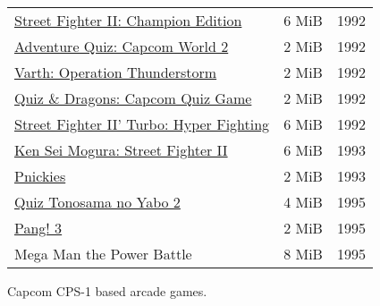 \begin{figure}[H]
{\begin{tabularx}{\textwidth}{Xrr}
  \toprule    
\href{}{Street Fighter II: Champion Edition} & 6 MiB & 1992 \\ 
\href{}{Adventure Quiz: Capcom World 2} & 2 MiB & 1992 \\ 
\href{}{Varth: Operation Thunderstorm} & 2 MiB & 1992 \\ 
\href{}{Quiz \& Dragons: Capcom Quiz Game} & 2 MiB & 1992 \\ 
\href{}{Street Fighter II' Turbo: Hyper Fighting} &  6 MiB & 1992 \\ 
  \toprule    
\href{}{Ken Sei Mogura: Street Fighter II} & 6 MiB & 1993 \\ 
\href{}{Pnickies} & 2 MiB & 1993 \\ 
  \toprule    
\href{}{Quiz Tonosama no Yabo 2} &  4 MiB & 1995 \\ 
\href{}{Pang! 3} & 2 MiB  & 1995 \\ 
Mega Man the Power Battle & 8 MiB  & 1995 \\

\toprule    
\end{tabularx}%
}\caption*{Capcom CPS-1 based arcade games.}
\end{figure}











